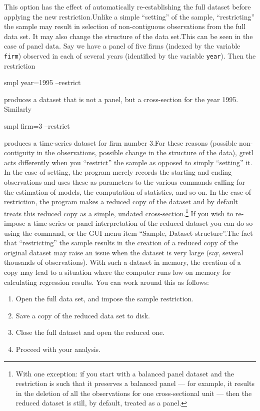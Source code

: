 This option has the effect of automatically re-establishing the full
dataset before applying the new restriction.Unlike a simple
``setting'' of the sample, ``restricting'' the sample may result in
selection of non-contiguous observations from the full data set.  It
may also change the structure of the data set.This can be seen in the
case of panel data.  Say we have a panel of five firms (indexed by the
variable \verb+firm+) observed in each of several years (identified by
the variable \verb+year+).  Then the restriction
%
\begin{code}
	smpl year=1995 --restrict
\end{code}
%
produces a dataset that is not a panel, but a cross-section for the
year 1995.  Similarly
%
\begin{code}
	smpl firm=3 --restrict
\end{code}
%
produces a time-series dataset for firm number 3.For these reasons
(possible non-contiguity in the observations, possible change in the
structure of the data), gretl acts differently when you ``restrict''
the sample as opposed to simply ``setting'' it. In the case of
setting, the program merely records the starting and ending
observations and uses these as parameters to the various commands
calling for the estimation of models, the computation of statistics,
and so on. In the case of restriction, the program makes a reduced
copy of the dataset and by default treats this reduced copy as a
simple, undated cross-section.\footnote{With one exception: if you
  start with a balanced panel dataset and the restriction is such that
  it preserves a balanced panel --- for example, it results in the
  deletion of all the observations for one cross-sectional unit ---
  then the reduced dataset is still, by default, treated as a panel.}
If you wish to re-impose a time-series or panel interpretation of the
reduced dataset you can do so using the  command, or the
GUI menu item ``Sample, Dataset structure''.The fact that
``restricting'' the sample results in the creation of a reduced copy
of the original dataset may raise an issue when the dataset is very
large (say, several thousands of observations).  With such a dataset
in memory, the creation of a copy may lead to a situation where the
computer runs low on memory for calculating regression results.  You
can work around this as follows:

\begin{enumerate}
\item Open the full data set, and impose the sample restriction.
\item Save a copy of the reduced data set to disk.
\item Close the full dataset and open the reduced one.
\item Proceed with your analysis.
\end{enumerate}

